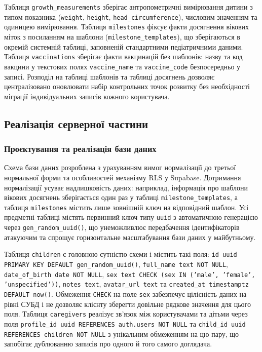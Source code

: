 Таблиця \texttt{growth\_measurements} зберігає антропометричні вимірювання дитини з типом показника (\texttt{weight}, \texttt{height}, \texttt{head\_circumference}), числовим значенням та одиницею вимірювання. Таблиця \texttt{milestones} фіксує факти досягнення вікових міток з посиланням на шаблони (\texttt{milestone\_templates}), що зберігаються в окремій системній таблиці, заповненій стандартними педіатричними даними. Таблиця \texttt{vaccinations} зберігає факти вакцинацій без шаблонів: назву та код вакцини у текстових полях \texttt{vaccine\_name} та \texttt{vaccine\_code} безпосередньо у записі. Розподіл на таблиці шаблонів та таблиці досягнень дозволяє централізовано оновлювати набір контрольних точок розвитку без необхідності міграції індивідуальних записів кожного користувача.

\subsection{Реалізація серверної частини}

\subsubsection{Проєктування та реалізація бази даних}

Схема бази даних розроблена з урахуванням вимог нормалізації до третьої нормальної форми та особливостей механізму \gls{RLS} у Supabase. Дотримання нормалізації усуває надлишковість даних: наприклад, інформація про шаблони вікових досягнень зберігається один раз у таблиці \texttt{milestone\_templates}, а таблиця \texttt{milestones} містить лише зовнішній ключ на відповідний шаблон. Усі предметні таблиці містять первинний ключ типу \texttt{uuid} з автоматичною генерацією через \texttt{gen\_random\_uuid()}, що унеможливлює передбачення ідентифікаторів атакуючим та спрощує горизонтальне масштабування бази даних у майбутньому.

Таблиця \texttt{children} є головною сутністю схеми і містить такі поля: \texttt{id uuid PRIMARY KEY DEFAULT gen\_random\_uuid()}, \texttt{full\_name text NOT NULL}, \texttt{date\_of\_birth date NOT NULL}, \texttt{sex text CHECK (sex IN ('male', 'female', 'unspecified'))}, \texttt{notes text}, \texttt{avatar\_url text} та \texttt{created\_at timestamptz DEFAULT now()}. Обмеження \texttt{CHECK} на поле \texttt{sex} забезпечує цілісність даних на рівні \gls{СУБД} і не дозволяє клієнту зберегти довільне рядкове значення для цього поля. Таблиця \texttt{caregivers} реалізує зв'язок між користувачами та дітьми через поля \texttt{profile\_id uuid REFERENCES auth.users NOT NULL} та \texttt{child\_id uuid REFERENCES children NOT NULL} з унікальним обмеженням на цю пару, що запобігає дублюванню записів про одного й того самого доглядача.

